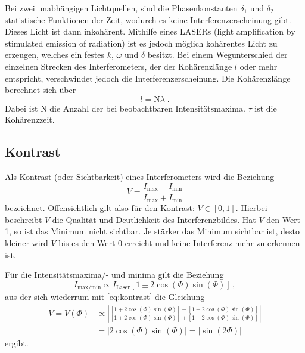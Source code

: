 Bei zwei unabhängigen Lichtquellen, sind die Phasenkonstanten $\delta_1$ und $\delta_2$ statistische Funktionen der Zeit, wodurch es keine 
Interferenzerscheinung gibt. Dieses Licht ist dann inkohärent. Mithilfe eines LASERs (light amplification by stimulated emission of radiation)
ist es jedoch möglich kohärentes Licht zu erzeugen, welches ein festes $k$, $\omega$ und $\delta$ besitzt.
Bei einem Wegunterschied der einzelnen Strecken des Interferometers, der der Kohärenzlänge $l$ oder mehr entspricht, verschwindet jedoch die 
Interferenzerscheinung. Die Kohärenzlänge berechnet sich über
\begin{equation*}
    l = \text{N}\lambda \; .
\end{equation*}
Dabei ist N die Anzahl der bei beobachtbaren Intensitätsmaxima. $\tau$ ist die Kohärenzzeit. 



\subsection{Kontrast} \label{sec:kontrast}
Als Kontrast (oder Sichtbarkeit) eines Interferometers wird die Beziehung
\begin{equation} \label{eq:kontrast}
    V = \frac{I_\text{max} - I_\text{min}}{I_\text{max} + I_\text{min}}
\end{equation}
bezeichnet. Offensichtlich gilt also für den Kontrast: $V \in [0,1]$.
Hierbei beschreibt $V$ die Qualität und Deutlichkeit des Interferenzbildes. Hat $V$ den Wert 1, so ist das Minimum nicht sichtbar. Je stärker das Minimum sichtbar ist, desto kleiner wird $V$ bis es den Wert 0 erreicht und keine Interferenz mehr zu erkennen ist.

Für die Intensitätsmaxima/- und minima gilt die Beziehung
\begin{equation*}
    I_\text{max/min} \propto I_\text{Laser} \left[ 1 \pm 2 \cos(\Phi) \sin (\Phi) \right] \, ,
\end{equation*}
aus der sich wiederrum mit \autoref{eq:kontrast} die Gleichung
\begin{align}\label{eq:kontrast2}
    V = V(\Phi) &\propto \left|\frac{\left[ 1 + 2 \cos(\Phi) \sin (\Phi) \right] - \left[ 1 - 2 \cos(\Phi) \sin (\Phi) \right]}{\left[ 1 + 2 \cos(\Phi) \sin (\Phi) \right] + \left[ 1 - 2 \cos(\Phi) \sin (\Phi) \right]}\right| \\
    &= \left|2 \cos(\Phi) \sin(\Phi) \right| = \left| \sin (2 \Phi) \right|
\end{align}
ergibt. %

